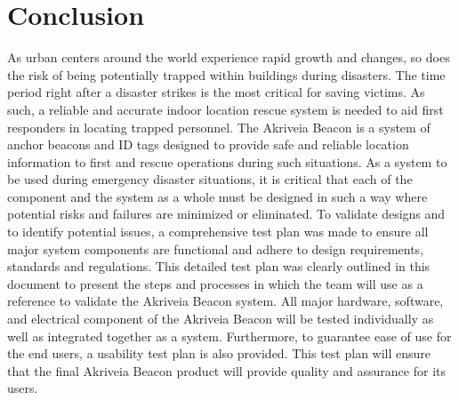 

\setcounter{section}{6}
\section{Conclusion}
\bigskip
As urban centers around the world experience rapid growth and changes, so does the risk of being potentially trapped within buildings during disasters. The time period right after a disaster strikes is the most critical for saving victims. As such, a reliable and accurate indoor location rescue system is needed to aid first responders in locating trapped personnel. The Akriveia Beacon is a system of anchor beacons and ID tags designed to provide safe and reliable location information to first and rescue operations during such situations. 
\bigskip
As a system to be used during emergency disaster situations, it is critical that each of the component and the system as a whole must be designed in such a way where potential risks and failures are minimized or eliminated. To validate designs and to identify potential issues, a comprehensive test plan was made to ensure all major system components are functional and adhere to design requirements, standards and regulations. 
\bigskip
This detailed test plan was clearly outlined in this document to present the steps and processes in which the team will use as a reference to validate the Akriveia Beacon system. All major hardware, software, and electrical component of the Akriveia Beacon will be tested individually as well as integrated together as a system. Furthermore, to guarantee ease of use for the end users, a usability test plan is also provided. This test plan will ensure that the final Akriveia Beacon product will provide quality and assurance for its users.
